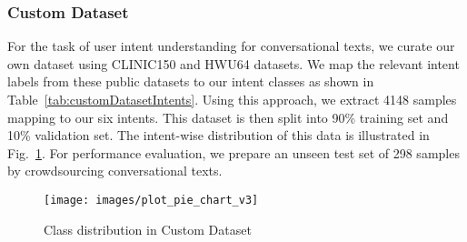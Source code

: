 \documentclass[conference]{IEEEtran}
\begin{document}
\subsubsection{Custom Dataset}\label{sec:customDataset}

For the task of user intent understanding for conversational texts, we curate our own dataset using CLINIC150 \cite{larson-etal-2019-evaluation} and HWU64 \cite{Liu2019BenchmarkingNL} datasets. We map the relevant intent labels from these public datasets to our intent classes as shown in Table~\ref{tab:customDatasetIntents}. Using this approach, we extract 4148 samples mapping to our six intents. This dataset is then split into 90\% training set and 10\% validation set. The intent-wise distribution of this data is illustrated in Fig.~\ref{fig:customDatasetClassDistribution}. For performance evaluation, we prepare an unseen test set of 298 samples by crowdsourcing conversational texts.

\begin{figure}[t]
	\centering
	\texttt{[image: images/plot\_pie\_chart\_v3]}
	\caption{Class distribution in Custom Dataset}
	\label{fig:customDatasetClassDistribution}
\end{figure}
\end{document}
